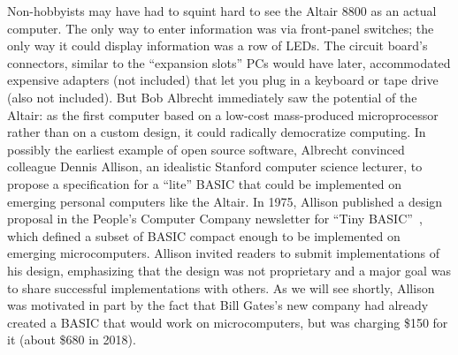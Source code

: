 Non-hobbyists may have had to squint hard to see the Altair 8800 as an
actual computer.
The only way to enter information was via front-panel switches;
the only way it could display information was a row of LEDs.
The circuit board's connectors, similar to the ``expansion slots'' PCs
would have later, accommodated expensive adapters (not included) that
let you plug in a keyboard or tape drive (also not included).
But Bob Albrecht immediately saw the potential of the Altair: as the
first computer based on a low-cost mass-produced microprocessor rather
than on a custom design, it could radically democratize computing.
In possibly the earliest example of open source software, Albrecht convinced
colleague Dennis Allison, an idealistic Stanford computer science
lecturer, to propose a specification for a ``lite'' BASIC that could
be implemented on emerging personal computers like the Altair.
In 1975, Allison published a design proposal in the People's Computer
Company newsletter for ``Tiny BASIC''~\cite{allison_tiny_basic}, which
defined
a subset of BASIC compact enough to be implemented on emerging microcomputers.
Allison invited readers to submit implementations of his design, 
emphasizing that the design was not proprietary and a major goal was to
share successful implementations with others.  As we will see shortly,
Allison was motivated in part by the fact that Bill Gates's new
company had already created a BASIC that would work on microcomputers, but was charging
\$150 for it (about \$680 in 2018).


